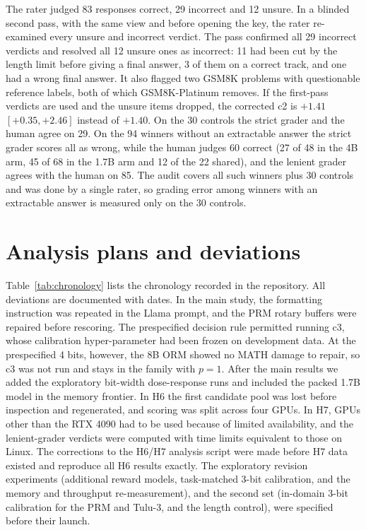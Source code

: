 The rater judged 83 responses correct, 29 incorrect and 12 unsure. In a blinded second
pass, with the same view and before opening the key, the rater re-examined every unsure
and incorrect verdict. The pass confirmed all 29 incorrect verdicts and resolved all 12
unsure ones as incorrect: 11 had been cut by the length limit before giving a final
answer, 3 of them on a correct track, and one had a wrong final answer. It also flagged
two GSM8K problems with questionable reference labels, both of which GSM8K-Platinum
removes. If the first-pass verdicts are used and the unsure items dropped, the corrected
c2 is $+1.41$\pp\ $[+0.35, +2.46]$ instead of $+1.40$. On the 30 controls the strict
grader and the human agree on 29. On the 94 winners without an extractable answer the
strict grader scores all as wrong, while the human judges 60 correct (27 of 48 in the 4B
arm, 45 of 68 in the 1.7B arm and 12 of the 22 shared), and the lenient grader agrees
with the human on 85. The audit covers all such winners plus 30 controls and was done by
a single rater, so grading error among winners with an extractable answer is measured
only on the 30 controls.

\section{Analysis plans and deviations}\label{app:deviations}

Table~\ref{tab:chronology} lists the chronology recorded in the repository. All
deviations are documented with dates. In the main study, the formatting instruction was
repeated in the Llama prompt, and the PRM rotary buffers were repaired before rescoring.
The prespecified decision rule permitted running c3, whose calibration hyper-parameter
had been frozen on development data. At the prespecified 4 bits, however, the 8B ORM
showed no MATH damage to repair, so c3 was not run and stays in the family with $p=1$.
After the main results we added the exploratory bit-width dose-response runs and
included the packed 1.7B model in the memory frontier. In H6 the first candidate pool
was lost before inspection and regenerated, and scoring was split across four GPUs. In
H7, GPUs other than the RTX 4090 had to be used because of limited availability, and the
lenient-grader verdicts were computed with time limits equivalent to those on Linux. The
corrections to the H6/H7 analysis script were made before H7 data existed and
reproduce all H6 results exactly. The exploratory revision experiments (additional
reward models, task-matched 3-bit calibration, and the memory and throughput
re-measurement), and the second set (in-domain 3-bit calibration for the PRM and Tulu-3,
and the length control), were specified before their launch.

